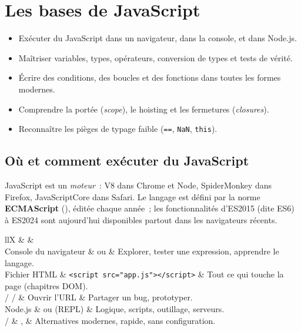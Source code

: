\chapter{Les bases de JavaScript}
\label{ch-js-bases}

\begin{objectif}
\begin{itemize}
  \item Ex\'ecuter du JavaScript dans un navigateur, dans la console, et dans Node.js.
  \item Ma\^itriser variables, types, op\'erateurs, conversion de types et tests de v\'erit\'e.
  \item \'Ecrire des conditions, des boucles et des fonctions dans toutes les formes modernes.
  \item Comprendre la port\'ee (\emph{scope}), le hoisting et les fermetures (\emph{closures}).
  \item Reconna\^itre les pi\`eges de typage faible (\verb|==|, \verb|NaN|, \verb|this|).
\end{itemize}
\end{objectif}

\section{O\`u et comment ex\'ecuter du JavaScript}

JavaScript est un \emph{moteur}~: V8 dans Chrome et Node, SpiderMonkey dans Firefox,
JavaScriptCore dans Safari. Le langage est d\'efini par la norme \textbf{ECMAScript}
(), \'edit\'ee chaque ann\'ee~; les fonctionnalit\'es
d'ES2015 (dite ES6) \`a ES2024 sont aujourd'hui disponibles partout dans les navigateurs r\'ecents.

\begin{tabz}{llX}
  \headrow {} \&  \&  \\
  \midrule
  Console du navigateur \&  ou  \& Explorer, tester une expression, apprendre le langage. \\
  Fichier HTML \& \verb|<script src="app.js"></script>| \& Tout ce qui touche la page (chapitres DOM). \\
   /  /  \& Ouvrir l'URL \& Partager un bug, prototyper. \\
  Node.js \&  ou  (REPL) \& Logique, scripts, outillage, serveurs. \\
   /  \& ,  \& Alternatives modernes, rapide, sans configuration. \\
\end{tabz}

